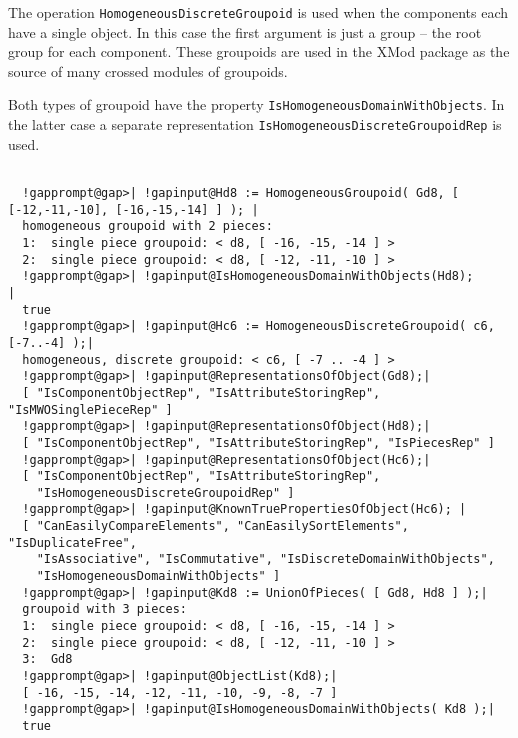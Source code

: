 \documentclass[a4paper,11pt]{report}
\begin{document}
{{{ The operation \texttt{HomogeneousDiscreteGroupoid} is used when the components each have a single object. In this case the first
argument is just a group -- the root group for each component. These groupoids
are used in the \textsf{XMod} package as the source of many crossed modules of groupoids. 

 Both types of groupoid have the property  \texttt{IsHomogeneousDomainWithObjects}. In the latter case a separate representation  \texttt{IsHomogeneousDiscreteGroupoidRep} is used. 

 }

 
\begin{Verbatim}[commandchars=!@|,fontsize=\small,frame=single,label=Example]
  
  !gapprompt@gap>| !gapinput@Hd8 := HomogeneousGroupoid( Gd8, [ [-12,-11,-10], [-16,-15,-14] ] ); |
  homogeneous groupoid with 2 pieces:
  1:  single piece groupoid: < d8, [ -16, -15, -14 ] >
  2:  single piece groupoid: < d8, [ -12, -11, -10 ] >
  !gapprompt@gap>| !gapinput@IsHomogeneousDomainWithObjects(Hd8);               |
  true
  !gapprompt@gap>| !gapinput@Hc6 := HomogeneousDiscreteGroupoid( c6, [-7..-4] );|
  homogeneous, discrete groupoid: < c6, [ -7 .. -4 ] >
  !gapprompt@gap>| !gapinput@RepresentationsOfObject(Gd8);|
  [ "IsComponentObjectRep", "IsAttributeStoringRep", "IsMWOSinglePieceRep" ]
  !gapprompt@gap>| !gapinput@RepresentationsOfObject(Hd8);|
  [ "IsComponentObjectRep", "IsAttributeStoringRep", "IsPiecesRep" ]
  !gapprompt@gap>| !gapinput@RepresentationsOfObject(Hc6);|
  [ "IsComponentObjectRep", "IsAttributeStoringRep", 
    "IsHomogeneousDiscreteGroupoidRep" ]
  !gapprompt@gap>| !gapinput@KnownTruePropertiesOfObject(Hc6); |
  [ "CanEasilyCompareElements", "CanEasilySortElements", "IsDuplicateFree", 
    "IsAssociative", "IsCommutative", "IsDiscreteDomainWithObjects", 
    "IsHomogeneousDomainWithObjects" ]
  !gapprompt@gap>| !gapinput@Kd8 := UnionOfPieces( [ Gd8, Hd8 ] );|
  groupoid with 3 pieces:
  1:  single piece groupoid: < d8, [ -16, -15, -14 ] >
  2:  single piece groupoid: < d8, [ -12, -11, -10 ] >
  3:  Gd8
  !gapprompt@gap>| !gapinput@ObjectList(Kd8);|
  [ -16, -15, -14, -12, -11, -10, -9, -8, -7 ]
  !gapprompt@gap>| !gapinput@IsHomogeneousDomainWithObjects( Kd8 );|
  true
  
\end{Verbatim}
 }

}
\end{document}
